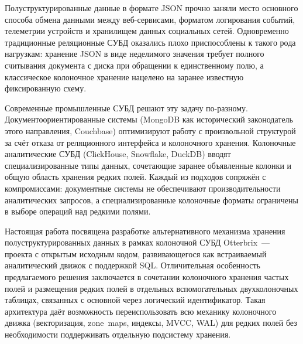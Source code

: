 
Полуструктурированные данные в формате JSON прочно заняли место
основного способа обмена данными между веб-сервисами, форматом
логирования событий, телеметрии устройств и хранилищем данных
социальных сетей. Одновременно традиционные реляционные СУБД
оказались плохо приспособлены к такого рода нагрузкам: хранение
JSON в виде неделимого значения требует полного считывания
документа с диска при обращении к единственному полю, а
классическое колоночное хранение нацелено на заранее известную
фиксированную схему.

Современные промышленные СУБД решают эту задачу по-разному.
Документоориентированные системы (MongoDB как исторический
законодатель этого направления, Couchbase) оптимизируют работу с
произвольной структурой за счёт отказа от реляционного интерфейса
и колоночного хранения. Колоночные аналитические СУБД (ClickHouse,
Snowflake, DuckDB) вводят специализированные типы данных,
сочетающие заранее объявленные колонки и общую область хранения
редких полей. Каждый из подходов сопряжён с компромиссами:
документные системы не обеспечивают производительности
аналитических запросов, а специализированные колоночные форматы
ограничены в выборе операций над редкими полями.

Настоящая работа посвящена разработке альтернативного механизма
хранения полуструктурированных данных в рамках колоночной СУБД
Otterbrix~--- проекта с открытым исходным кодом, развивающегося как
встраиваемый аналитический движок с поддержкой SQL. Отличительная
особенность предлагаемого решения заключается в сочетании колоночного
хранения частых полей и размещения редких полей в отдельных
вспомогательных двухколоночных таблицах, связанных с основной через
логический идентификатор. Такая архитектура даёт возможность
переиспользовать всю механику колоночного движка (векторизация,
zone~maps, индексы, MVCC, WAL) для редких полей без необходимости
поддерживать отдельную подсистему хранения.

